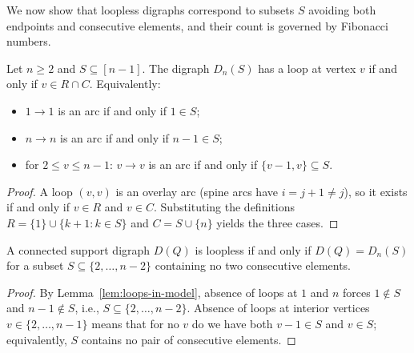 
We now show that loopless digraphs correspond to subsets $S$ avoiding both
endpoints and consecutive elements, and their count is governed by Fibonacci
numbers.


\begin{lemma}\label{lem:loops-in-model}
Let $n \ge 2$ and $S \subseteq [n-1]$. The digraph $D_n(S)$ has a loop at
vertex $v$ if and only if $v \in R \cap C$. Equivalently:
\begin{itemize}[leftmargin=2em]
\item $1 \to 1$ is an arc if and only if $1 \in S$;
\item $n \to n$ is an arc if and only if $n - 1 \in S$;
\item for $2 \le v \le n - 1$: $v \to v$ is an arc if and only if
  $\{v - 1, v\} \subseteq S$.
\end{itemize}
\end{lemma}
\begin{proof}
A loop $(v, v)$ is an overlay arc (spine arcs have $i = j + 1 \neq j$), so it
exists if and only if $v \in R$ and $v \in C$. Substituting the definitions
$R = \{1\} \cup \{k + 1 : k \in S\}$ and $C = S \cup \{n\}$ yields the three
cases.
\end{proof}

\begin{corollary}\label{cor:loopless-characterization}
A connected support digraph $D(Q)$ is loopless if and only if
$D(Q) = D_n(S)$ for a subset $S \subseteq \{2, \dots, n-2\}$ containing no
two consecutive elements.
\end{corollary}
\begin{proof}
By Lemma~\ref{lem:loops-in-model}, absence of loops at $1$ and $n$ forces
$1 \notin S$ and $n - 1 \notin S$, i.e., $S \subseteq \{2, \dots, n-2\}$.
Absence of loops at interior vertices $v \in \{2, \dots, n-1\}$ means that
for no $v$ do we have both $v - 1 \in S$ and $v \in S$; equivalently, $S$
contains no pair of consecutive elements.
\end{proof}

